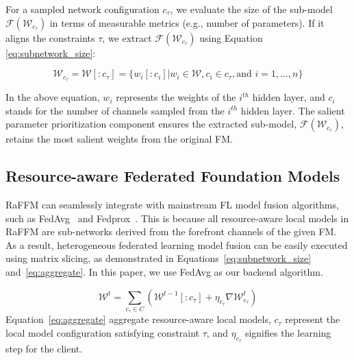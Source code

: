 For a sampled network configuration \( c_\tau \), we evaluate the size of the sub-model \( \mathcal{F}(\mathcal{W}_{c_\tau}) \) in terms of measurable metrics (e.g., number of parameters). If it aligns the constraints \( \tau \), we extract \( \mathcal{F}(\mathcal{W}_{c_\tau}) \) using Equation \ref{eq:subnetwork_size}:


\begin{equation}
\mathcal{W}_{c_\tau} =\mathcal{W}[:c_\tau] = \{w_i[:c_i] | w_i \in \mathcal{W}, c_i \in c_\tau, \text{and } i = 1,...,n \}
\label{eq:subnetwork_size}
\end{equation}

In the above equation, \( w_i \) represents the weights of the \( i^{th} \) hidden layer, and \( c_i \) stands for the number of channels sampled from the \( i^{th} \) hidden layer.  The salient parameter prioritization component ensures the extracted sub-model, \( \mathcal{F}(\mathcal{W}_{c_\tau}) \), retains the most salient weights from the original FM.



\subsection{Resource-aware Federated Foundation Models}
RaFFM can seamlessly integrate with mainstream FL model fusion algorithms, such as FedAvg~\citep{mcmahan2017fedavg} and Fedprox~\citep{li2020fedprox}. This is because all resource-aware local models in RaFFM are sub-networks derived from the forefront channels of the given FM. As a result, heterogeneous federated learning model fusion can be easily executed using matrix slicing, as demonstrated in Equations~\ref{eq:subnetwork_size} and~\ref{eq:aggregate}. In this paper, we use FedAvg as our backend algorithm.

\begin{equation}
\mathcal{W}^t = \sum_{c_\tau \in C}(\mathcal{W}^{t-1}[:c_\tau] + \eta_{c_\tau}  \nabla \mathcal{W}_{c_\tau}^t)
\label{eq:aggregate}
\end{equation}
Equation~\ref{eq:aggregate} aggregate resource-aware local models, $c_\tau$ represent the local model configuration satisfying constraint $\tau$, and  $\eta_{c_\tau}$ signifies the learning step for the client. 

